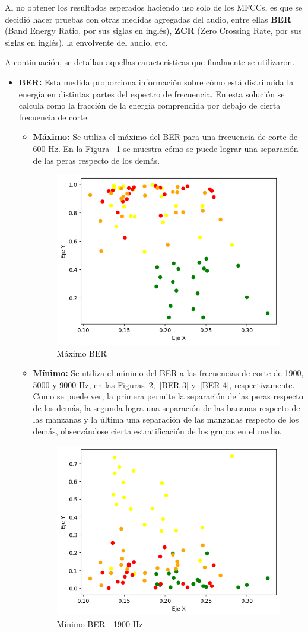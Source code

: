 \documentclass[a4paper, 12pt]{article}
\begin{document}
Al no obtener los resultados esperados haciendo uso solo de los MFCCs, es que se decidió hacer pruebas con otras medidas agregadas del audio, entre ellas \textbf{BER} (Band Energy Ratio, por sus siglas en inglés), \textbf{ZCR} (Zero Crossing Rate, por sus siglas en inglés), la envolvente del audio, etc.

A continuación, se detallan aquellas características que finalmente se utilizaron.

\begin{itemize}
    \item \textbf{BER:} Esta medida proporciona información sobre cómo está distribuida la energía en distintas partes del espectro de frecuencia. En esta solución se calcula como la fracción de la energía comprendida por debajo de cierta frecuencia de corte.
    
    \begin{itemize}
        \item \textbf{Máximo:} Se utiliza el máximo del BER para una frecuencia de corte de 600 Hz. En la Figura ~\ref{BER 1} se muestra cómo se puede lograr una separación de las peras respecto de los demás.
            \begin{figure}[h]
                \centering
                \includegraphics[width=0.4\linewidth]{BER1.png}
                \caption{Máximo BER}
                \label{BER 1}
            \end{figure}
        \item \textbf{Mínimo:} Se utiliza el mínimo del BER a las frecuencias de corte de 1900, 5000 y 9000 Hz, en las Figuras~\ref{BER 2},~\ref{BER 3} y~\ref{BER 4}, respectivamente. Como se puede ver, la primera permite la separación de las peras respecto de los demás, la segunda logra una separación de las bananas respecto de las manzanas y la última una separación de las manzanas respecto de los demás, observándose cierta estratificación de los grupos en el medio.
            \begin{figure}[h]
                \centering
                \includegraphics[width=0.4\linewidth]{BER2.png}
                \caption{Mínimo BER - 1900 Hz}
                \label{BER 2}
            \end{figure}
            

\end{itemize}
\end{itemize}
\end{document}
